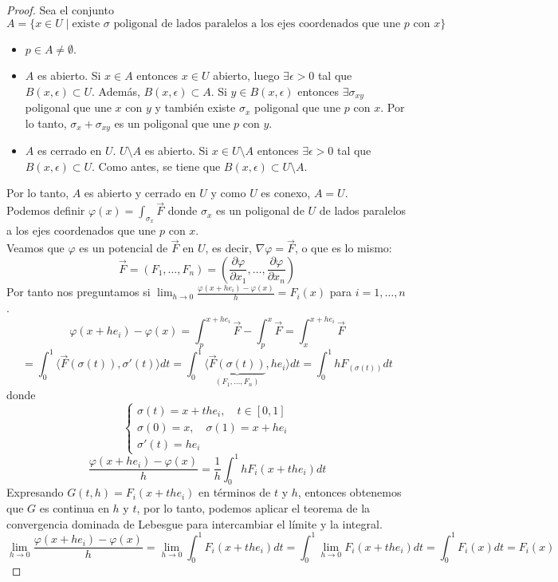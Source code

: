 \begin{proof}
Sea el conjunto $$A = \{x \in U \mid \text{existe } \sigma \text{ poligonal de lados paralelos a los ejes coordenados que une } p \text{ con } x\}$$
\begin{itemize}
    \item $p \in A \neq \emptyset$.
    \item $A$ es abierto. Si $x \in A$ entonces $x \in U$ abierto, luego $\exists \epsilon > 0$ tal que $B(x, \epsilon) \subset U$. Además, $B(x, \epsilon) \subset A$. Si $y \in B(x, \epsilon)$ entonces $\exists \sigma_{xy}$ poligonal que une $x$ con $y$ y también existe $\sigma_{x}$ poligonal que une $p$ con $x$. Por lo tanto, $\sigma_{x} + \sigma_{xy}$ es un poligonal que une $p$ con $y$.
    \item $A$ es cerrado en $U$. $U \setminus A$ es abierto. Si $x \in U \setminus A$ entonces $\exists \epsilon > 0$ tal que $B(x, \epsilon) \subset U$. Como antes, se tiene que $B(x, \epsilon) \subset U \setminus A$.
\end{itemize} 
Por lo tanto, $A$ es abierto y cerrado en $U$ y como $U$ es conexo, $A = U$.\\
Podemos definir $\varphi(x) = \int_{\sigma_{x}} \vec{F}$ donde $\sigma_{x}$ es un poligonal de $U$ de lados paralelos a los ejes coordenados que une $p$ con $x$.\\
Veamos que $\varphi$ es un potencial de $\vec{F}$ en $U$, es decir, $\nabla \varphi = \vec{F}$, o que es lo mismo: 
$$\vec{F} = (F_1, \ldots, F_n) = \left(\frac{\partial \varphi}{\partial x_1}, \ldots, \frac{\partial \varphi}{\partial x_n}\right)$$
Por tanto nos preguntamos si $\lim_{h \to 0} \frac{\varphi(x + he_i) - \varphi(x)}{h} = F_i(x)$ para $i = 1, \ldots, n$.
$$ \varphi (x + he_i) - \varphi(x) = \int_{p}^{x + he_i} \vec{F} - \int_{p}^{x} \vec{F} = \int_{x}^{x + he_i} \vec{F}$$
$$= \int_{0}^{1} \langle \vec{F}(\sigma(t)), \sigma'(t) \rangle dt 
= \int_{0}^{1} \langle \underbrace{\vec{F}(\sigma(t))}_{(F_1, \ldots, F_n)}, 
h e_i \rangle dt = \int_{0}^{1} h F_(\sigma(t)) dt$$
donde 
\[
\begin{cases}
\sigma(t) = x + the_i, \quad t \in [0,1] \\
\sigma(0) = x, \quad \sigma(1) = x + he_i\\
\sigma'(t) = h e_i
\end{cases}
\]
$$ \frac{\varphi(x+he_i)-\varphi(x)}{h} = \frac{1}{h} \int_{0}^{1} h F_i(x+the_i) dt$$
Expresando $G(t,h) = F_i(x+the_i)$ en términos de $t$ y $h$, entonces obtenemos que $G$ es continua en $h$ y $t$, por lo tanto, podemos aplicar el teorema de la convergencia dominada de Lebesgue para intercambiar el límite y la integral.
$$\lim_{h \to 0} \frac{\varphi(x+he_i)-\varphi(x)}{h} = \lim_{h \to 0} \int_{0}^{1} F_i(x+the_i) dt = \int_{0}^{1} \lim_{h \to 0} F_i(x+the_i) dt = \int_{0}^{1} F_i(x) dt = F_i(x)$$
\end{proof}


